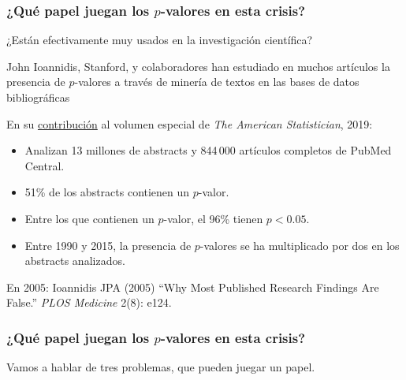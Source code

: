 \documentclass[9pt]{beamer}
\begin{document}
\begin{frame}
  \frametitle{¿Qué papel juegan los $p$-valores en esta crisis?}
  ¿Están efectivamente muy usados en la investigación científica?
  \onslide<+->

  \begin{block}{}
    John Ioannidis, Stanford, y colaboradores han estudiado en muchos
    artículos la presencia de $p$-valores a través de minería de textos
    en las bases de datos bibliográficas
  \end{block}
  \onslide<+-> En su \href{https://doi.org/10.1080/00031305.2018.1447512}{contribución} al volumen especial de \textit{The
    American Statistician}, 2019:
  \begin{itemize}
  \item<+-> Analizan  13 millones de abstracts y 844\,000 artículos
    completos de PubMed Central.
  \item<+-> 51\% de los abstracts contienen un $p$-valor.
  \item<+-> Entre los que contienen un $p$-valor, el 96\% tienen
    $p<0.05$.
  \item<+-> Entre 1990 y 2015, la presencia de $p$-valores se ha
    multiplicado por dos en los abstracts analizados. 
  \end{itemize}\bigskip
  \onslide<+->

  \begin{center}
  \end{center}
  \onslide<+-> En 2005:
   Ioannidis JPA (2005) ``Why Most Published Research Findings Are False.'' \textit{PLOS Medicine} 2(8): e124.
\end{frame}

\begin{frame}
  \frametitle{¿Qué papel juegan los $p$-valores en esta crisis?}
    \begin{overlayarea}{\textwidth}{0.8\textheight}
  Vamos a hablar de tres problemas, que pueden juegar un
  papel.\vspace{1cm}
  \onslide<+->
  \begin{center}
  \end{center}
\end{overlayarea}
\end{frame}
\end{document}
